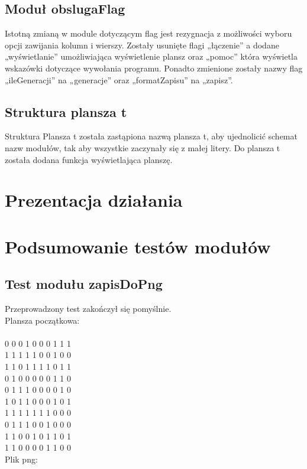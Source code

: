 \documentclass[10pt, oneside]{article}
\begin{document}
\subsection{Moduł obslugaFlag}
Istotną zmianą w module dotyczącym flag jest rezygnacja z możliwości wyboru opcji zawijania kolumn i wierszy. 
Zostały usunięte flagi „łączenie” a dodane „wyświetlanie” umożliwiająca wyświetlenie plansz oraz „pomoc” która wyświetla wskazówki dotyczące wywołania programu. Ponadto zmienione zostały nazwy flag „ileGeneracji” na „generacje” oraz „formatZapisu” na „zapisz”.

\subsection{Struktura plansza t}
Struktura Plansza t została zastąpiona nazwą plansza t, aby ujednolicić schemat nazw modułów, tak aby wszystkie zaczynały się z małej litery. Do plansza t została dodana funkcja wyświetlająca planszę. 

\section{Prezentacja działania}


\section{Podsumowanie testów modułów}
\subsection{Test modułu zapisDoPng}
Przeprowadzony test zakończył się pomyślnie. \\
Plansza początkowa:\\
\\
0 0 0 1 0 0 0 1 1 1 \\
1 1 1 1 1 0 0 1 0 0 \\
1 1 0 1 1 1 1 0 1 1 \\
0 1 0 0 0 0 0 1 1 0 \\
0 1 1 1 0 0 0 0 1 0 \\
1 0 1 1 0 0 0 1 0 1 \\
1 1 1 1 1 1 1 0 0 0 \\
0 1 1 1 0 0 1 0 0 0 \\
1 1 0 0 1 0 1 1 0 1 \\
1 1 0 0 0 0 1 1 0 0 \\


Plik png:
 
\end{document}
